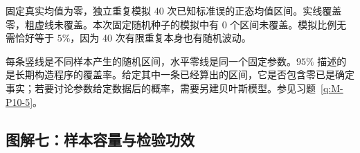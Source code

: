 \documentclass[UTF8,12pt,a4paper,fontset=fandol]{ctexbook}
\begin{document}
固定真实均值为零，独立重复模拟 40 次已知标准误的正态均值区间。实线覆盖零，粗虚线未覆盖。本次固定随机种子的模拟中有 0 个区间未覆盖。模拟比例无需恰好等于 $5\%$，因为 40 次有限重复本身也有随机波动。

每条竖线是不同样本产生的随机区间，水平零线是同一个固定参数。$95\%$ 描述的是长期构造程序的覆盖率。给定其中一条已经算出的区间，它是否包含零已是确定事实；若要讨论参数给定数据后的概率，需要另建贝叶斯模型。参见习题~\ref{q:M-P10-5}。

\clearpage\subsection*{图解七：样本容量与检验功效}

\begin{center}%
\end{center}
\end{document}
